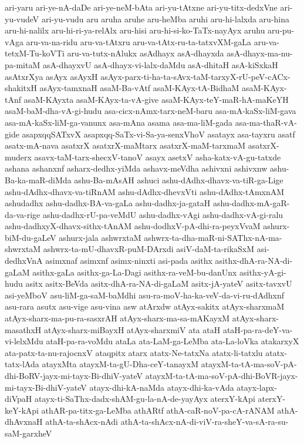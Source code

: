 {ari-yaru
ari-ye-nA-daDe
ari-ye-neM-bAta
ari-yu-tAtxne
ari-yu-titx-dedxVne
ari-yu-vudeV
ari-yu-vudu
aru
aruha
aruhe
aru-heMba
aruhi
aru-hi-lalxda
aru-hina
aru-hi-nalilx
aru-hi-ri-ya-relAlx
aru-hisi
aru-hi-si-ko-TaTx-nayAyx
aruhu
aru-pu-vAga
aru-va-na-ridu
aru-va-tAtxru
aru-va-tAtx-ru-ta-tatxvXM-gaLa
aru-va-tetxM-Tu-koVTi
aru-va-tutx-nAlukx
asAdhayx
asA-dhayxda
asA-dhayx-ma-nu-pa-mitaM
asA-dhayxvU
asA-dhayx-vi-lalx-daMdu
asA-dhitaH
asA-kiSxkaH
asAtxrXya
asAyx
asAyxH
asAyx-parx-ti-ha-ta-sAvx-taM-tarxyX-rU-peV-cACx-shakitxH
asAyx-tamxnaH
asaM-Ba-vAtf
asaM-KAyx-tA-BidhaM
asaM-KAyx-tAnf
asaM-KAyxta
asaM-KAyx-ta-vA-give
asaM-KAyx-teY-maR-hA-maKeYH
asaM-baM-dha-vA-gi-hudu
asa-cicx-nAmx-tarx-neM-baru
asa-mA-kaSx-liM-gava
asa-mA-kaSx-liM-ga-vanunx
asa-mAna
asama
asa-ma-liM-gada
asa-ma-thaR-vA-gide
asapxqqSATxvX
asapxqq-SaTx-vi-Sa-ya-senxVhoV
asatayx
asa-tayxru
asatf
asatx-mA-nava
asatxrX
asatxrX-maMtarx
asatxrX-maM-tarxmaM
asatxrX-muderx
asavx-taM-tarx-shecxV-tanoV
asayx
asetxV
asha-katx-vA-gu-tatxde
ashana
ashanxnf
asharx-dedhx-yiMda
ashavx-meVdha
ashivxni
ashivxnw
ashu-Ba-ka-maR-diMda
ashu-Ba-mAsAH
ashuci
ashu-dAdhx-dhavx-va-tiR-ga-Lige
ashu-dAdhx-dhavx-va-tiRnAM
ashu-dAdhx-dhevxVti
ashu-dAdhx-tAmxnAM
ashudadhx
ashu-dadhx-BA-va-gaLa
ashu-dadhx-ja-gataH
ashu-dadhx-mA-gaR-da-va-rige
ashu-dadhx-rU-pa-veMdU
ashu-dadhx-vAgi
ashu-dadhx-vA-gi-ralu
ashu-dadhxyX-dhavx-sithx-tAnAM
ashu-dodhxV-pA-dhi-ra-peyxVvaM
ashurx-biM-du-gaLeV
ashurx-jala
ashwrxtaM
ashwrx-ta-dha-maR-ni-SAThx-nA-ma-shwrxtaM
ashwrx-ta-mU-dhavxR-puM-DArxdi
asiV-daM-ta-rikaSxM
asi-dedhxVnA
asimxnaf
asimxnf
asimx-ninxti
asi-pada
asithx
asithx-dhA-ra-NA-di-gaLaM
asithx-gaLa
asithx-ga-La-Dagi
asithx-ra-veM-bu-danUnx
asithx-yA-gi-hudu
asitx
asitx-BeVda
asitx-dhA-ra-NA-di-gaLaM
asitx-jA-yateV
asitx-tavxvU
asi-yeMboV
asu-liM-ga-saM-baMdhi
asu-ra-moV-ha-ka-veV-da-vi-ru-dAdhxnf
asu-rara
asutx
asu-vige
asu-vina
asw
atArxdw
atAyx-sakitx
atAyx-sharxmaM
atAyx-sharx-ma-pu-ra-sasxrAH
atAyx-sharx-ma-sa-mAKayxM
atAyx-sharx-masathxH
atAyx-sharx-miBayxH
atAyx-sharxmiV
ata
ataH
ataH-pa-ra-deY-va-vi-lelxMdu
ataH-pa-ra-voMdu
ataLa
ata-LaM-ga-LeMba
ata-La-loVka
atakarxyX
ata-patx-ta-nu-rajocnxV
ataqpitx
atarx
atatx-Ne-tatxNa
atatx-li-tatxlu
atatx-tatx-lAda
atayxMta
atayxM-ta-gU-Dha-ceY-tanayxM
atayxM-ta-tA-ma-soV-pA-dhi-BoRV-jayx-mi-tayx-Bi-dhiV-yateV
atayxM-ta-tA-ma-soV-pA-dhi-BoVR-jayx-mi-tayx-Bi-dhiV-yateV
atayx-dhi-kA-naMda
atayx-dhi-ka-vAda
atayx-lapx-diVpaH
atayx-ti-SaThx-dadx-shAM-gu-la-nA-de-yayAyx
aterxY-kApi
aterxY-keY-kApi
athAR-pa-titx-ga-LeMba
athARtf
athA-caR-noV-pa-cA-rANAM
athA-dhAvxnaH
athA-ta-shAcx-nAdi
athA-ta-shAcx-nA-di-viV-ra-sheY-va-sA-ra-su-saM-garxheV
}
